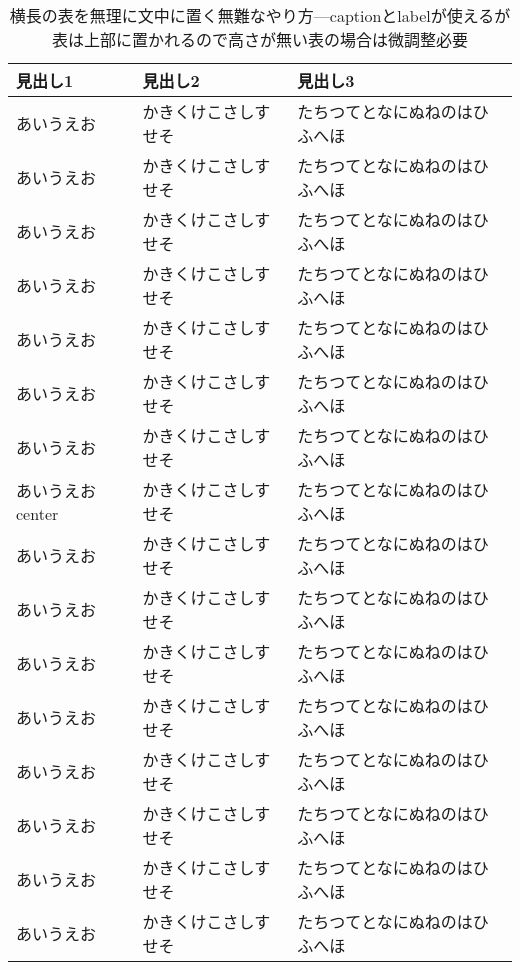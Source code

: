 \documentclass{jsce}
\begin{document}
\begin{table}  %
\mbox{}        %
\vspace*{25mm} %
\begin{center}
\caption{横長の表を無理に文中に置く無難なやり方---captionとlabelが使えるが表は上部に置かれるので高さが無い表の場合は微調整必要}
\label{tab:landscape3}
\begin{tabular}{|p{6cm}|p{8cm}|p{8cm}|} \hline
見出し1 & 見出し2 & 見出し3 \\ \hline\hline
あいうえお & かきくけこさしすせそ & たちつてとなにぬねのはひふへほ \\ \hline
あいうえお & かきくけこさしすせそ & たちつてとなにぬねのはひふへほ \\ \hline
あいうえお & かきくけこさしすせそ & たちつてとなにぬねのはひふへほ \\ \hline
あいうえお & かきくけこさしすせそ & たちつてとなにぬねのはひふへほ \\ \hline
あいうえお & かきくけこさしすせそ & たちつてとなにぬねのはひふへほ \\ \hline
あいうえお & かきくけこさしすせそ & たちつてとなにぬねのはひふへほ \\ \hline
あいうえお & かきくけこさしすせそ & たちつてとなにぬねのはひふへほ \\ \hline
あいうえおcenter & かきくけこさしすせそ & たちつてとなにぬねのはひふへほ \\ \hline
あいうえお & かきくけこさしすせそ & たちつてとなにぬねのはひふへほ \\ \hline
あいうえお & かきくけこさしすせそ & たちつてとなにぬねのはひふへほ \\ \hline
あいうえお & かきくけこさしすせそ & たちつてとなにぬねのはひふへほ \\ \hline
あいうえお & かきくけこさしすせそ & たちつてとなにぬねのはひふへほ \\ \hline
あいうえお & かきくけこさしすせそ & たちつてとなにぬねのはひふへほ \\ \hline
あいうえお & かきくけこさしすせそ & たちつてとなにぬねのはひふへほ \\ \hline
あいうえお & かきくけこさしすせそ & たちつてとなにぬねのはひふへほ \\ \hline
あいうえお & かきくけこさしすせそ & たちつてとなにぬねのはひふへほ \\ \hline
\end{tabular}
\end{center}
\end{table}
\end{document}
